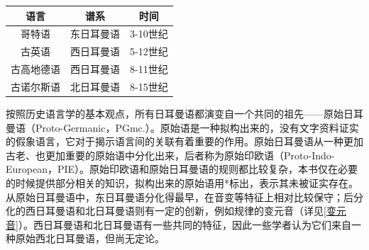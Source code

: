 \begin{table}[H]
    \centering
    \begin{tabular}{@{}ccc@{}}
        \toprule
        \textbf{语言} & \textbf{谱系} & \textbf{时间} \\ \midrule
        哥特语         & 东日耳曼语       & 3-10世纪      \\
        古英语         & 西日耳曼语       & 5-12世纪      \\
        古高地德语       & 西日耳曼语       & 8-11世纪      \\
        古诺尔斯语       & 北日耳曼语       & 8-15世纪      \\ \bottomrule
    \end{tabular}
\end{table}

按照历史语言学的基本观点，所有日耳曼语都演变自一个共同的祖先——原始日耳曼语（Proto-Germanic，PGmc.）。原始语是一种拟构出来的，没有文字资料证实的假象语言，它对于揭示语言间的关联有着重要的作用。原始日耳曼语从一种更加古老、也更加重要的原始语中分化出来，后者称为原始印欧语（Proto-Indo-European，PIE）。原始印欧语和原始日耳曼语的规则都比较复杂，本书仅在必要的时候提供部分相关的知识，拟构出来的原始语用*标出，表示其未被证实存在。从原始日耳曼语中，东日耳曼语分化得最早，在音变等特征上相对比较保守；后分化的西日耳曼语和北日耳曼语则有一定的创新，例如规律的变元音（详见\ref{变元音}）。西日耳曼语和北日耳曼语有一些共同的特征，因此一些学者认为它们来自一种原始西北日耳曼语，但尚无定论。


